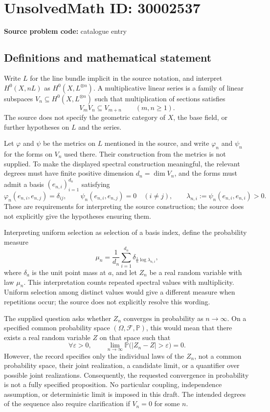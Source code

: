 \documentclass[11pt]{article}
\begin{document}
\section*{UnsolvedMath ID: 30002537}
\textbf{Source problem code:} catalogue entry
\subsection{Definitions and mathematical statement}
Write \(L\) for the line bundle implicit in the source notation, and interpret \(H^0(X,nL)\) as \(H^0(X,L^{\otimes n})\). A multiplicative linear series is a family of linear subspaces \(V_n\subseteq H^0(X,L^{\otimes n})\) such that multiplication of sections satisfies
\[
V_mV_n\subseteq V_{m+n}\qquad(m,n\geq 1).
\]
The source does not specify the geometric category of \(X\), the base field, or further hypotheses on \(L\) and the series.

Let \(\varphi\) and \(\psi\) be the metrics on \(L\) mentioned in the source, and write \(\varphi_n\) and \(\psi_n\) for the forms on \(V_n\) used there. Their construction from the metrics is not supplied. To make the displayed spectral construction meaningful, the relevant degrees must have finite positive dimension \(d_n=\dim V_n\), and the forms must admit a basis \((e_{n,i})_{i=1}^{d_n}\) satisfying
\[
\varphi_n(e_{n,i},e_{n,j})=\delta_{ij},\qquad
\psi_n(e_{n,i},e_{n,j})=0\quad(i\ne j),\qquad
\lambda_{n,i}:=\psi_n(e_{n,i},e_{n,i})>0.
\]
These are requirements for interpreting the source construction; the source does not explicitly give the hypotheses ensuring them.

Interpreting uniform selection as selection of a basis index, define the probability measure
\[
\mu_n=\frac{1}{d_n}\sum_{i=1}^{d_n}
\delta_{\frac{1}{n}\log\lambda_{n,i}},
\]
where \(\delta_a\) is the unit point mass at \(a\), and let \(Z_n\) be a real random variable with law \(\mu_n\). This interpretation counts repeated spectral values with multiplicity. Uniform selection among distinct values would give a different measure when repetitions occur; the source does not explicitly resolve this wording.

The supplied question asks whether \(Z_n\) converges in probability as \(n\to\infty\). On a specified common probability space \((\Omega,\mathcal F,\mathbb P)\), this would mean that there exists a real random variable \(Z\) on that space such that
\[
\forall\varepsilon>0,\qquad
\lim_{n\to\infty}\mathbb P\bigl(|Z_n-Z|>\varepsilon\bigr)=0.
\]
However, the record specifies only the individual laws of the \(Z_n\), not a common probability space, their joint realization, a candidate limit, or a quantifier over possible joint realizations. Consequently, the requested convergence in probability is not a fully specified proposition. No particular coupling, independence assumption, or deterministic limit is imposed in this draft. The intended degrees of the sequence also require clarification if \(V_n=0\) for some \(n\).
\end{document}
